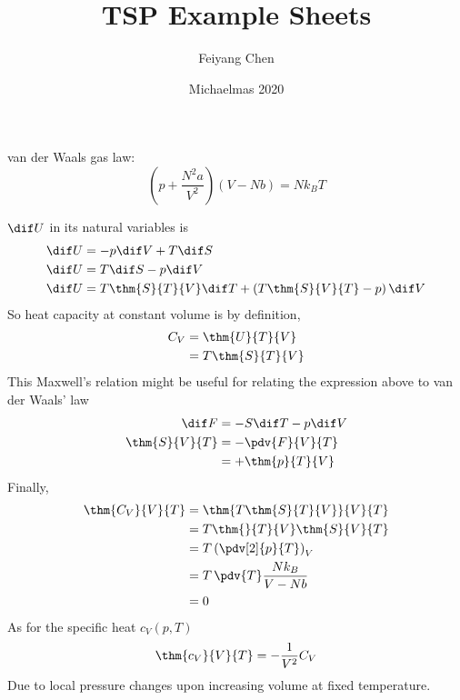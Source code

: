 \documentclass[12pt]{article}
\begin{document}
\title{TSP Example Sheets}
\author{Feiyang Chen}
\date{Michaelmas 2020}
\maketitle
\thispagestyle{empty}
\tableofcontents
\newpage
\section{}
\subsection{} van der Waals gas law:
        \[\left(p + \frac{N^2a}{V^2} \right)(V - Nb) = Nk_BT\]
        
        $ \dif U$ in its natural variables is
        \begin{align*}
           \dif U &=  - p\dif V + T\dif S\\
            \dif U &=  T\dif S - p\dif V\\
            \dif U &=  T \thm{S}{T}{V}\dif T +\left(T\thm{S}{V}{T} - p\right)\dif V
        \end{align*}
        So heat capacity at constant volume is by definition,
        \begin{align*}
            C_V &=  \thm{U}{T}{V} \\&=  T\thm{S}{T}{V}
        \end{align*}
        This Maxwell's relation might be useful for relating the expression above to van der Waals' law
        \begin{align*}
            \dif F &=  - S\dif T - p\dif V\\
            \thm{S}{V}{T} &= - \pdv{F}{V}{T} \\&= +\thm{p}{T}{V}
        \end{align*}
        Finally,
        \begin{align*}
            \thm{C_V}{V}{T} &= \thm{T\thm{S}{T}{V}}{V}{T}\\
            &= T \thm{}{T}{V}\thm{S}{V}{T}\\
            &= T \left(\pdv[2]{p}{T}\right)_V\\
            &= T\, \pdv{T} \frac{Nk_B}{V - Nb}\\
            &= 0
        \end{align*}
        As for the specific heat $c_V(p,T)$
        \begin{align*}
            \thm{c_V}{V}{T} = - \frac{1}{V^2}C_V
        \end{align*}
        Due to local pressure changes upon increasing volume at fixed temperature.
\end{document}
